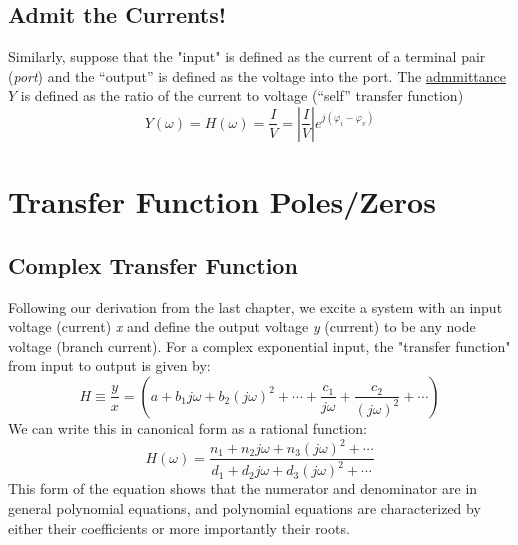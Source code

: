 \subsection{Admit the Currents!}
Similarly, suppose that the "input" is defined as the current of a terminal pair (\textit{port}) and the “output” is defined as the voltage into the port. The \underline{admmittance} $Y$ is defined as the ratio of the current to voltage (“self” transfer function)
    \begin{equation}
        Y(\omega ) = H(\omega ) = \frac{I}{V} = \left| {\frac{I}{V}} \right|{e^{j({\varphi _i} - {\varphi _v})}}
    \end{equation}
\section{Transfer Function Poles/Zeros}
\subsection{Complex Transfer Function}
Following our derivation from the last chapter, we excite a system with an input voltage (current) \textit{x} and define the output voltage \textit{y} (current) to be any node voltage (branch current).  For a complex exponential input, the "transfer function" from input to output is given by:
    \begin{equation}
        H \equiv \frac{y}{x} = \left( {a + {b_1}j\omega  + {b_2}{{(j\omega )}^2} +  \cdots  + \frac{{{c_1}}}{{j\omega }} + \frac{{{c_2}}}{{{{(j\omega )}^2}}} +  \cdots } \right)
    \end{equation}
 We can write this in canonical form as a rational function:
    \begin{equation}
        H(\omega ) = \frac{{{n_1} + {n_2}j\omega  + {n_3}{{(j\omega )}^2} +  \cdots }}{{{d_1} + {d_2}j\omega  + {d_3}{{(j\omega )}^2} +  \cdots }}
    \end{equation}
This form of the equation shows that the numerator and denominator are in general polynomial equations, and polynomial equations are characterized by either their coefficients or more importantly their roots.
